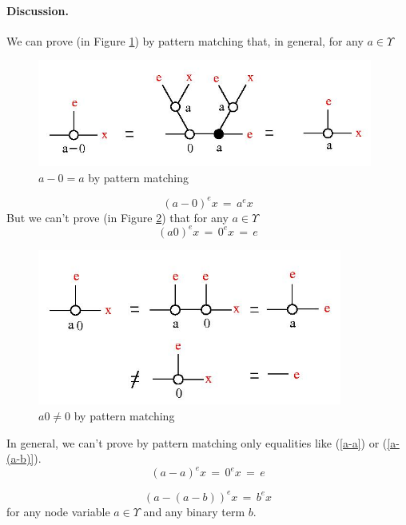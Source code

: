 \paragraph{Discussion.} We can prove (in Figure \ref{a-0-fig}) by pattern matching that, in general, for any $a \in \Upsilon$ 
\begin{figure}[h] \centerline{\includegraphics[width=110mm]{jpg/a-0.jpg}}  \caption{ $a-0 = a$ by pattern matching} \label{a-0-fig} \end{figure}
\begin{equation}
(a-0)^{e} x \,  = \, a^{e} x
\label{a-0}
\end{equation}
But we can't prove (in Figure \ref{a0-fig}) that  for any $a \in \Upsilon$ 
\begin{equation}
(a 0)^{e} x \,  = \, 0^{e} x \, = \, e
\label{a0}
\end{equation}
\begin{figure}[h] \centerline{\includegraphics[width=100mm]{jpg/a0.jpg}}
\caption{ $a 0 \not = 0$ by pattern matching }
\label{a0-fig}
\end{figure}




In general, we can't prove by pattern matching only equalities like (\ref{a-a}) or (\ref{a-(a-b)}). 
\begin{equation}
(a-a)^{e} x \,  = \, 0^{e} x \, = \, e
\label{a-a}
\end{equation}

\begin{equation}
(a-(a-b))^{e} x \, =\, b^{e} x
\label{a-(a-b)}
\end{equation}
for any node variable $a \in \Upsilon$ and any binary term $b$.  


